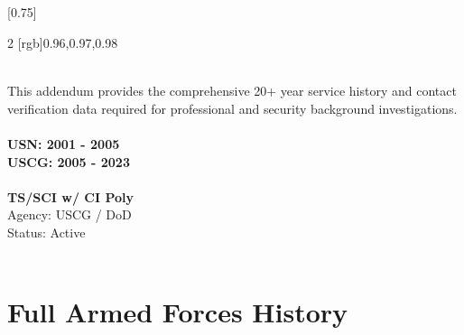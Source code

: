 \documentclass[lighthipster]{simplehipstercv}
\begin{document}
\thispagestyle{empty}


\subsection*{}
\vspace{4em}

\setlength{\columnsep}{1.5cm}
[0.75]
\begin{paracol}{2}
[rgb]{0.96,0.97,0.98} 
\paracolbackgroundoptions

\footnotesize
{\setasidefontcolour
\flushright  
\begin{center}
\end{center}

\\[0.5em]
This addendum provides the comprehensive 20+ year service history and contact verification data required for professional and security background investigations.\\[1em]

\\[0.5em]
\textbf{USN: 2001 - 2005}\\
\textbf{USCG: 2005 - 2023}\\[1em]

\\[0.5em]
\textbf{TS/SCI w/ CI Poly}\\
Agency: USCG / DoD\\
Status: Active\\[1em]

\\[0.5em]
\begin{flushleft} 
\vspace{4em}
\end{flushleft}
}

\switchcolumn
\small

\section*{Full Armed Forces History}


\end{paracol}
\end{document}

